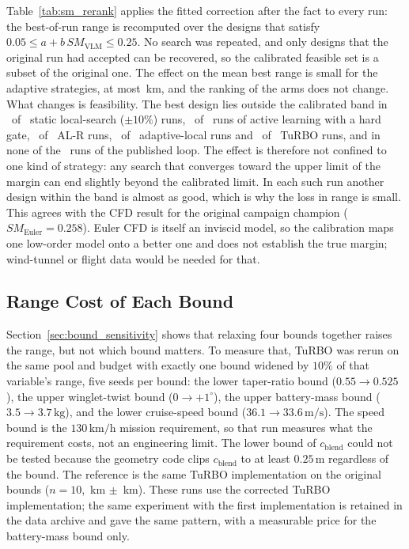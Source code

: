 Table~\ref{tab:sm_rerank} applies the fitted correction after the fact to every run: the best-of-run range is recomputed over the designs that satisfy $0.05 \le a + b\,SM_{\mathrm{VLM}} \le 0.25$. No search was repeated, and only designs that the original run had accepted can be recovered, so the calibrated feasible set is a subset of the original one. The effect on the mean best range is small for the adaptive strategies, at most \NcalLossAlHard\,km, and the ranking of the arms does not change. What changes is feasibility. The best design lies outside the calibrated band in \NcalOutLocTen\ of \NcalOutNLocTen\ static local-search ($\pm 10\%$) runs, \NcalOutAlHard\ of \NcalOutNAlHard\ runs of active learning with a hard gate, \NcalOutAlR\ of \NcalOutNAlR\ AL-R runs, \NcalOutAdapt\ of \NcalOutNAdapt\ adaptive-local runs and \NcalOutTurbo\ of \NcalOutNTurbo\ TuRBO runs, and in none of the \NcalOutNAlSoft\ runs of the published loop. The effect is therefore not confined to one kind of strategy: any search that converges toward the upper limit of the margin can end slightly beyond the calibrated limit. In each such run another design within the band is almost as good, which is why the loss in range is small. This agrees with the CFD result for the original campaign champion ($SM_{\mathrm{Euler}} = 0.258$). Euler CFD is itself an inviscid model, so the calibration maps one low-order model onto a better one and does not establish the true margin; wind-tunnel or flight data would be needed for that.

\subsection{Range Cost of Each Bound}
\label{sec:bound_prices}
Section~\ref{sec:bound_sensitivity} shows that relaxing four bounds together raises the range, but not which bound matters. To measure that, TuRBO was rerun on the same pool and budget with exactly one bound widened by $10\%$ of that variable's range, five seeds per bound: the lower taper-ratio bound ($0.55 \to 0.525$), the upper winglet-twist bound ($0 \to +1^\circ$), the upper battery-mass bound ($3.5 \to 3.7\,\mathrm{kg}$), and the lower cruise-speed bound ($36.1 \to 33.6\,\mathrm{m/s}$). The speed bound is the $130\,\mathrm{km/h}$ mission requirement, so that run measures what the requirement costs, not an engineering limit. The lower bound of $c_{\mathrm{blend}}$ could not be tested because the geometry code clips $c_{\mathrm{blend}}$ to at least $0.25\,\mathrm{m}$ regardless of the bound. The reference is the same TuRBO implementation on the original bounds ($n = 10$, \NbpRefMean\,km $\pm$ \NbpRefSd\,km). These runs use the corrected TuRBO implementation; the same experiment with the first implementation is retained in the data archive and gave the same pattern, with a measurable price for the battery-mass bound only.

